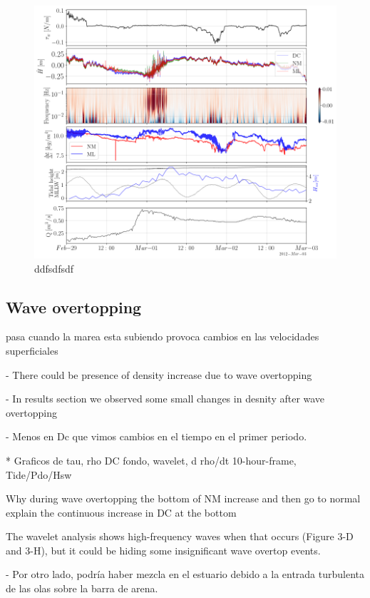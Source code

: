 \documentclass[tesis.tex]{subfiles}
\begin{document}
\begin{figure}[h!]
    \centering
    \includegraphics[width=\textwidth]{Imagenes/mix_q.png}
    \caption{ddfsdfsdf }
    \label{fig:mix_q}
\end{figure}

\subsection{Wave overtopping}

pasa cuando la marea esta subiendo 
provoca cambios en las velocidades superficiales


- There could be presence of density increase due to wave overtopping 

- In results section we observed some small changes in desnity after wave overtopping 

- Menos en Dc que vimos cambios en el tiempo en el primer periodo.

* Graficos de tau, rho DC fondo, wavelet, d rho/dt 10-hour-frame, Tide/Pdo/Hsw

Why during wave overtopping the bottom of NM increase and then go to normal
explain the  continuous increase in DC at the bottom

The wavelet analysis shows high-frequency waves when that occurs (Figure 3-D and 3-H), but it could be hiding some insignificant wave overtop events.

- Por otro lado, podría haber mezcla en el estuario debido a la entrada turbulenta de las olas sobre la barra de arena.
\end{document}
